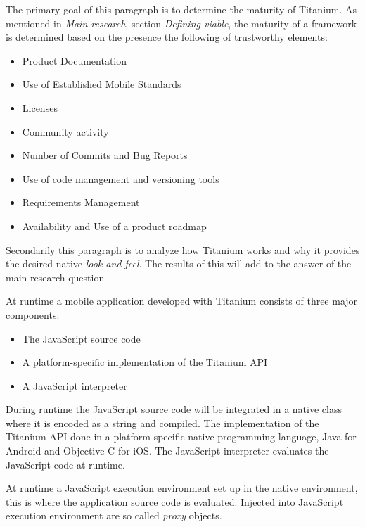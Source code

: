 
\noindent The primary goal of this paragraph is to determine the maturity of Titanium. As mentioned in \emph{Main research}, section \emph{Defining viable}, the maturity of a framework is determined based on the presence the following of trustworthy elements:

\begin{itemize}
  \setlength{\itemsep}{1pt}
  \setlength{\parskip}{0pt}
  \setlength{\parsep}{0pt}
\item Product Documentation
\item Use of Established Mobile Standards
\item Licenses
\item Community activity
\item Number of Commits and Bug Reports
\item Use of code management and versioning tools
\item Requirements Management
\item Availability and Use of a product roadmap
\end{itemize}

Secondarily this paragraph is to analyze how Titanium works and why it provides the desired native \emph{look-and-feel}. The results of this will add to the answer of the main research question




At runtime a mobile application developed with Titanium consists of three major components:
\begin{itemize}
	\item
	The JavaScript source code
	\item
	A platform-specific implementation of the Titanium API
	\item
	A JavaScript interpreter
\end{itemize}

During runtime the JavaScript source code will be integrated in a native class where it is encoded as a string and compiled. The implementation of the Titanium API done in a platform specific native programming language, Java for Android and Objective-C for iOS. The JavaScript interpreter evaluates the JavaScript code at runtime.


At runtime a JavaScript execution environment set up in the native environment, this is where the application source code is evaluated. Injected into JavaScript execution environment are so called \emph{proxy} objects.

